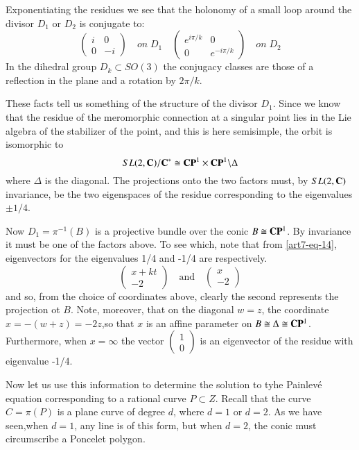 \begin{remark*}
Exponentiating the residues we see that the holonomy of a small loop around the divisor $D_{1}$ or $D_{2}$ is conjugate to:
$$
\left(
\begin{matrix}
i  & 0\\
0 & -i
\end{matrix}
\right)
\quad on \; D_{1} \quad
\left(
\begin{matrix}
e^{i\pi /k}  & 0\\
0 & e^{-i\pi/k}
\end{matrix}
\right)
\quad on \; D_{2}
$$
In the dihedral group $D_{k} \subset SO(3)$ the conjugacy classes are those of a reflection in the plane and a rotation by $2\pi/k$.

These facts tell us something of the structure of the divisor $D_{1}$. Since we know that the residue of the meromorphic connection at a singular point lies in the Lie algebra of the stabilizer of the point, and this is here semisimple,
 the orbit is isomorphic to
 $$
 SL(2, \mathbf{C})/\mathbf{C}^{*} \cong \mathbf{C}\mathbf{P}^{1} \times \mathbf{C}\mathbf{P}^{1}\backslash \Delta
 $$
 where $\Delta$ is the diagonal. The projections onto the two factors must, by $SL(2, \mathbf{C})$ invariance, be the two eigenspaces of the residue corresponding to the eigenvalues $\pm1/4$.

 Now $D_{1}= \pi^{-1}(B)$ is a projective bundle over the conic $B\cong \mathbf{C}\mathbf{P}^{1}$. By invariance it must be one of the factors above. To see which, note that from \eqref{art7-eq-14}, eigenvectors for the eigenvalues 1/4 and -1/4 are respectively.
 $$
 \left(
 \begin{matrix}
x+kt\\
-2
 \end{matrix}
\right)
\quad \text{and}\quad
\left(
 \begin{matrix}
x\\
-2
 \end{matrix}
\right)
$$
and so, from the choice of coordinates above, clearly the second represents the projection ot $B$. Note, moreover, that on the diagonal $w=z$, the coordinate $x=-(w+z)=-2z$,\pageoriginale so that $x$ is an affine parameter on $B\cong \Delta \cong \mathbf{C}\mathbf{P}^{1}$. Furthermore, when $x=\infty$ the vector
$
\left(
\begin{matrix}
1\\
0
\end{matrix}
\right)
$
is an eigenvector of the residue with eigenvalue -1/4.

Now let us use this information to determine the solution to tyhe Painlev\'e equation corresponding to a rational curve $P\subset Z$. Recall that the curve $C=\pi(P)$ is a plane curve of degree $d$, where $d=1$ or $d=2$. As we have seen,when $d=1$, any line is of this form, but when $d=2$, the conic must circumscribe a Poncelet polygon.


\end{remark*}
